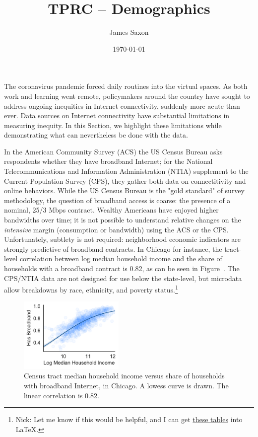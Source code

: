 \documentclass[11 pt]{amsart}
\title[TPRC -- Demographics]{TPRC -- Demographics}
\date{\today}
\author[Saxon]{\vspace{-1.7em} James Saxon}
\begin{document}
The coronavirus pandemic forced daily routines into the virtual spaces.
As both work and learning went remote, policymakers around the country
have sought to address ongoing inequities in Internet connectivity,
suddenly more acute than ever.
Data sources on Internet connectivity have substantial limitations
in measuring inequity.
In this Section, we highlight these limitations
while demonstrating what can nevertheless be done with the data.

In the American Community Survey (ACS)
the US Census Bureau asks respondents whether they have broadband Internet;
for the National Telecommunications and Information Administration (NTIA) supplement to the Current Population Survey (CPS),
they gather both data on connectitivity and online behaviors.
While the US Census Bureau is the "gold standard" of survey methodology,
the question of broadband access is coarse: the presence of a nominal, 25/3 Mbps contract.
Wealthy Americans have enjoyed higher bandwidths over time;
it is not possible to understand relative changes on the
\emph{intensive} margin (consumption or bandwidth) using the ACS or the CPS.
Unfortunately, subtlety is not required:
neighborhood economic indicators are strongly predictive of broadband contracts.
In Chicago for instance, the tract-level correlation between
log median household income and
the share of households with a broadband contract is 0.82,
as can be seen in Figure~.
The CPS/NTIA data are not designed for use below the state-level,
but microdata allow breakdowns by race, ethnicity, and poverty status.\footnote{Nick: Let me know if this would be helpful, and I can get \href{https://github.com/JamesSaxon/neighborhood\_broadband/blob/master/census/ipums.ipynb}{these tables} into \LaTeX.}

\begin{figure}[]
\centering
\includegraphics[width=0.45\textwidth]{broadband_income.pdf}
\caption{Census tract median household income versus share of households with broadband Internet, in Chicago.  A lowess curve is drawn. The linear correlation is 0.82.}
\end{figure}
\end{document}
